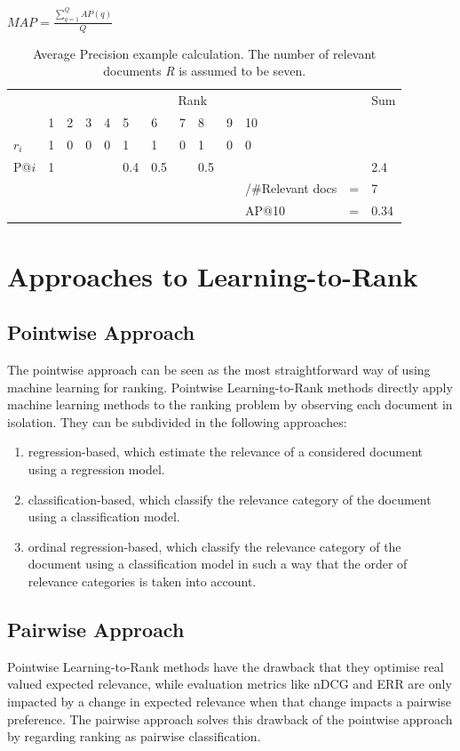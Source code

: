 $MAP = \frac{\sum\nolimits_{q=1}^{Q}AP(q)}{Q}$\\

\begin{table}
\begin{tabular}{lllllllllllll}
 & \multicolumn{10}{c}{Rank} &  & Sum \\ 
\cline{2-11}
 & 1 & 2 & 3 & 4 & 5 & 6 & 7 & 8 & 9 & 10 &  &  \\ 
\hline
$r_i$ & 1 & 0 & 0 & 0 & 1 & 1 & 0 & 1 & 0 & 0 &  &  \\ 
P@$i$ & 1 &  &  &  & 0.4 & 0.5 &  & 0.5 &  &  &  & 2.4 \\ 
\hline
 &  &  &  &  &  &  &  &  &  & /\#Relevant docs & = & 7 \\ 
 &  &  &  &  &  &  &  &  &  & AP@10 & = & 0.34 \\ 
\end{tabular}
\caption{Average Precision example calculation. The number of relevant documents \emph{R} is assumed to be seven.}
\label{tab:example_calculation_AP}
\end{table}

\chapter{Approaches to Learning-to-Rank}
\section{Pointwise Approach}
The pointwise approach can be seen as the most straightforward way of using machine learning for ranking. Pointwise Learning-to-Rank methods directly apply machine learning methods to the ranking problem by observing each document in isolation. They can be subdivided in the following approaches:
	\begin{enumerate}
	\item regression-based, which estimate the relevance of a considered document using a regression model.
	\item classification-based, which classify the relevance category of the document using a classification model.
	\item ordinal regression-based, which classify the relevance category of the document using a classification model in such a way that the order of relevance categories is taken into account. 
	\end{enumerate}
\section{Pairwise Approach}
Pointwise Learning-to-Rank methods have the drawback that they optimise real valued expected relevance, while evaluation metrics like \ac{nDCG} and \ac{ERR} are only impacted by a change in expected relevance when that change impacts a pairwise preference. The pairwise approach solves this drawback of the pointwise approach by regarding ranking as pairwise classification.\\

